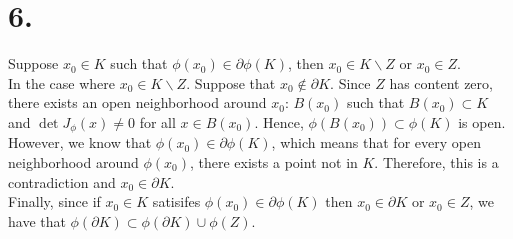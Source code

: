 \documentclass[11pt]{article}
\begin{document}
\section*{6.}
Suppose $x_0 \in K$ such that $\phi(x_0) \in \partial \phi(K)$, then $x_0 \in K\backslash Z$ or $x_0 \in Z$. \\
In the case where $x_0 \in K\backslash Z$. Suppose that $x_0 \notin \partial K$. 
Since $Z$ has content zero, 
there exists an open neighborhood around $x_0$: $B(x_0)$ such that $B(x_0) \subset K$ and $\det J_\phi(x) \ne 0$ for all $x \in B(x_0)$.
Hence, $\phi(B(x_0)) \subset \phi(K)$ is open. \\
However, we know that $\phi(x_0) \in \partial \phi(K)$, 
which means that for every open neighborhood around $\phi(x_0)$, there exists a point not in $K$. 
Therefore, this is a contradiction and $x_0 \in \partial K$. \\
Finally, since if $x_0 \in K$ satisifes $\phi(x_0) \in \partial \phi(K)$ then $x_0 \in \partial K$ or $x_0 \in Z$, 
we have that $\phi(\partial K) \subset \phi(\partial K) \cup \phi(Z)$.
\end{document}
